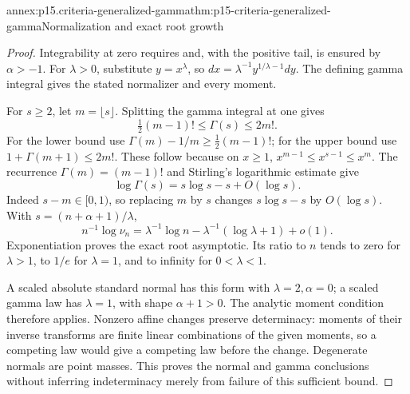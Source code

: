 \begin{annexitem}{annex:p15.criteria-generalized-gamma}{thm:p15-criteria-generalized-gamma}{Normalization and exact root growth}
\begin{proof}
Integrability at zero requires and, with the
positive tail, is ensured by \(\alpha>-1\).
For \(\lambda>0\), substitute \(y=x^\lambda\),
so \(dx=\lambda^{-1}y^{1/\lambda-1}dy\).
The defining gamma integral gives the stated
normalizer and every moment.

For \(s\geq2\), let \(m=\lfloor s\rfloor\).
Splitting the gamma integral at one gives
\[
 \tfrac12(m-1)!\leq\Gamma(s)\leq2m!.
\]
For the lower bound use
\(\Gamma(m)-1/m\geq\tfrac12(m-1)!\);
for the upper bound use \(1+\Gamma(m+1)\leq2m!\).
These follow because on \(x\geq1\),
\(x^{m-1}\leq x^{s-1}\leq x^m\).
The recurrence \(\Gamma(m)=(m-1)!\) and
Stirling's logarithmic estimate give
\[
 \log\Gamma(s)=s\log s-s+O(\log s).
\]
Indeed \(s-m\in[0,1)\), so replacing \(m\)
by \(s\) changes \(s\log s-s\) by \(O(\log s)\).
With \(s=(n+\alpha+1)/\lambda\),
\[
 n^{-1}\log\nu_n
 =\lambda^{-1}\log n-\lambda^{-1}(\log\lambda+1)+o(1).
\]
Exponentiation proves the exact root asymptotic.
Its ratio to \(n\) tends to zero for \(\lambda>1\),
to \(1/e\) for \(\lambda=1\), and to infinity
for \(0<\lambda<1\).

A scaled absolute standard normal has this
form with \(\lambda=2,\alpha=0\);
a scaled gamma law has \(\lambda=1\),
with shape \(\alpha+1>0\).
The analytic moment condition therefore applies.
Nonzero affine changes preserve determinacy:
moments of their inverse transforms are finite
linear combinations of the given moments,
so a competing law would give a competing
law before the change. Degenerate normals
are point masses.
This proves the normal and gamma conclusions
without inferring indeterminacy merely from
failure of this sufficient bound.
\end{proof}
\end{annexitem}

